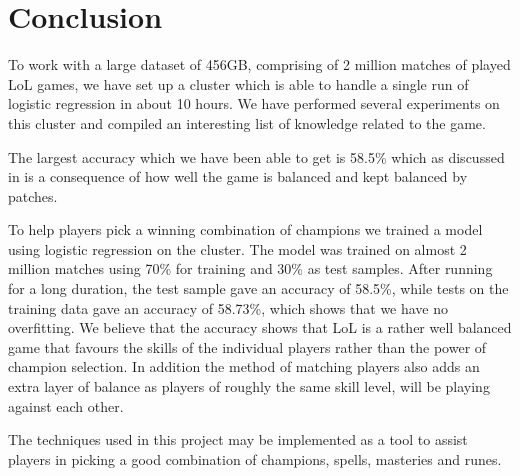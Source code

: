 \section{Conclusion}\label{sec:conclusion}
To work with a large dataset of 456GB, comprising of 2 million matches of played LoL games, we have set up a cluster which is able to handle a single run of logistic regression in about 10 hours. We have performed several experiments on this cluster and compiled an interesting list of knowledge related to the game.

The largest accuracy which we have been able to get is 58.5\% which as discussed in  is a consequence of how well the game is balanced and kept balanced by patches. 

To help players pick a winning combination of champions we trained a model using logistic regression on the cluster. The model was trained on almost 2 million matches using 70\% for training and 30\% as test samples. After running for a long duration, the test sample gave an accuracy of 58.5\%, while tests on the training data gave an accuracy of 58.73\%, which shows that we have no overfitting. We believe that the accuracy shows that LoL is a rather well balanced game that favours the skills of the individual players rather than the power of champion selection. In addition the method of matching players also adds an extra layer of balance as players of roughly the same skill level, will be playing against each other.

The techniques used in this project may be implemented as a tool to assist players in picking a good combination of champions, spells, masteries and runes.